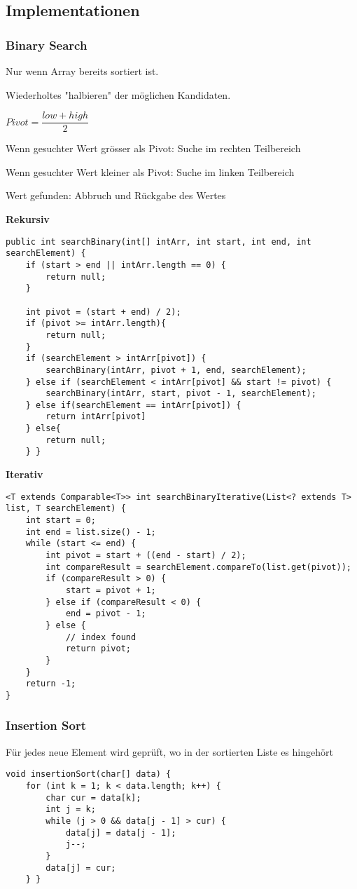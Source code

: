 \begin{multicols*}{4}
	\subsection{Implementationen}
		\subsubsection{Binary Search}
		Nur wenn Array bereits sortiert ist. 
		
		Wiederholtes "halbieren" der möglichen Kandidaten.
		
		$ Pivot = \dfrac{low + high}{2}  $
		
		Wenn gesuchter Wert grösser als Pivot: Suche im rechten Teilbereich
		
		Wenn gesuchter Wert kleiner als Pivot: Suche im linken Teilbereich
		
		Wert gefunden: Abbruch und Rückgabe des Wertes
		
		\textbf{Rekursiv}
			\begin{lstlisting}
public int searchBinary(int[] intArr, int start, int end, int searchElement) {
	if (start > end || intArr.length == 0) {
		return null;
	}

	int pivot = (start + end) / 2);
	if (pivot >= intArr.length){
		return null;
	}
	if (searchElement > intArr[pivot]) {
		searchBinary(intArr, pivot + 1, end, searchElement);
	} else if (searchElement < intArr[pivot] && start != pivot) {
		searchBinary(intArr, start, pivot - 1, searchElement);
	} else if(searchElement == intArr[pivot]) {
		return intArr[pivot]
	} else{
		return null;
	} }
			\end{lstlisting}
		
		\textbf{Iterativ}
			\begin{lstlisting}
<T extends Comparable<T>> int searchBinaryIterative(List<? extends T> list, T searchElement) { 
	int start = 0; 
	int end = list.size() - 1; 
	while (start <= end) { 
		int pivot = start + ((end - start) / 2); 
		int compareResult = searchElement.compareTo(list.get(pivot)); 
		if (compareResult > 0) { 
			start = pivot + 1; 
		} else if (compareResult < 0) { 
			end = pivot - 1; 
		} else { 
			// index found 
			return pivot; 
		} 
	} 
	return -1; 
} 
			\end{lstlisting}
		
		\subsubsection{Insertion Sort}
		Für jedes neue Element wird geprüft, wo in der sortierten Liste es hingehört
			\begin{lstlisting}
void insertionSort(char[] data) {
	for (int k = 1; k < data.length; k++) {
		char cur = data[k];
		int j = k;
		while (j > 0 && data[j - 1] > cur) {
			data[j] = data[j - 1];
			j--;
		}
		data[j] = cur;
	} }
			\end{lstlisting}
		

\end{multicols*}
